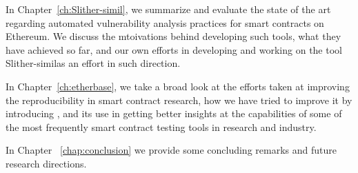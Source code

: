   In Chapter~\ref{ch:Slither-simil}, we summarize and evaluate the state of the art regarding automated vulnerability analysis practices for smart contracts on Ethereum.
  We discuss the mtoivations behind developing such tools, what they have achieved so far, and our own efforts in developing and working on the tool Slither-similas an effort in such direction.

  In Chapter~\ref{ch:etherbase}, we take a broad look at the efforts taken at improving the reproducibility in smart contract research, how we have tried to improve it by introducing \etherbase, and its use in getting better insights at the capabilities of some of the most frequently smart contract testing tools in research and industry.

  In Chapter ~\ref{chap:conclusion} we provide some concluding remarks and future research directions.